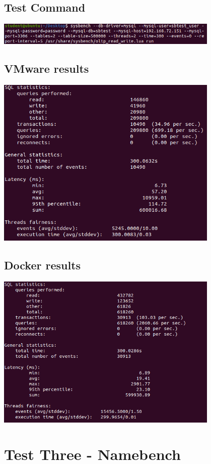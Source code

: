 \documentclass[12pt,twoside]{book}
\begin{document}
\subsection{Test Command}
\includegraphics[width=0.80\textwidth]{Appendicies/Test2Command.PNG}
\subsection{VMware results}
\includegraphics[width=0.80\textwidth]{Appendicies/VMwareTest2.PNG}
\subsection{Docker results}
\includegraphics[width=0.80\textwidth]{Appendicies/DockerTest2.PNG}
\section{Test Three - Namebench}
\end{document}
